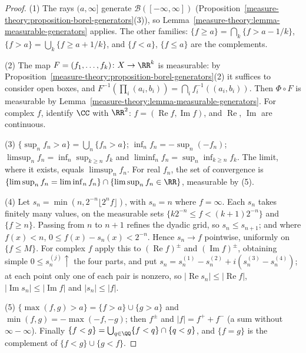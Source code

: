 \begin{proof}
(1) The rays $(a, \infty]$ generate $\mathcal{B}([-\infty, \infty])$ (Proposition~\ref{measure-theory:proposition-borel-generators}(3)), so Lemma~\ref{measure-theory:lemma-measurable-generators} applies. The other
families: $\{f \geq a\} = \bigcap_k\{f > a - 1/k\}$, $\{f > a\} = \bigcup_k\{f \geq a + 1/k\}$, and $\{f < a\}$, $\{f \leq a\}$ are the complements.

(2) The map $F = (f_1, \ldots, f_k) \colon X \to \RR^k$ is measurable: by Proposition~\ref{measure-theory:proposition-borel-generators}(2) it suffices to consider open boxes, and
$F^{-1}(\prod_i(a_i, b_i)) = \bigcap_if_i^{-1}((a_i, b_i))$. Then $\Phi \circ F$ is measurable by Lemma~\ref{measure-theory:lemma-measurable-generators}. For complex $f$, identify $\CC$ with $\RR^2$:
$f = (\operatorname{Re}f, \operatorname{Im}f)$, and $\operatorname{Re}$, $\operatorname{Im}$ are continuous.

(3) $\{\sup_nf_n > a\} = \bigcup_n\{f_n > a\}$; $\inf_nf_n = -\sup_n(-f_n)$; $\limsup_nf_n = \inf_n\sup_{k \geq n}f_k$ and $\liminf_nf_n = \sup_n\inf_{k \geq n}f_k$. The limit, where it exists, equals
$\limsup_nf_n$. For real $f_n$, the set of convergence is $\{\limsup_nf_n = \liminf_nf_n\} \cap \{\limsup_nf_n \in \RR\}$, measurable by (5).

(4) Let $s_n = \min(n, 2^{-n}\lfloor 2^nf\rfloor)$, with $s_n = n$ where $f = \infty$. Each $s_n$ takes finitely many values, on the measurable sets $\{k2^{-n} \leq f < (k + 1)2^{-n}\}$ and
$\{f \geq n\}$. Passing from $n$ to $n + 1$ refines the dyadic grid, so $s_n \leq s_{n+1}$; and where $f(x) < n$, $0 \leq f(x) - s_n(x) < 2^{-n}$. Hence $s_n \to f$ pointwise, uniformly on
$\{f \leq M\}$. For complex $f$ apply this to $(\operatorname{Re}f)^\pm$ and $(\operatorname{Im}f)^\pm$, obtaining simple $0 \leq s_n^{(j)} \uparrow$ the four parts, and put
$s_n = s_n^{(1)} - s_n^{(2)} + i(s_n^{(3)} - s_n^{(4)})$; at each point only one of each pair is nonzero, so $|\operatorname{Re}s_n| \leq |\operatorname{Re}f|$, $|\operatorname{Im}s_n| \leq |\operatorname{Im}f|$
and $|s_n| \leq |f|$.

(5) $\{\max(f, g) > a\} = \{f > a\} \cup \{g > a\}$ and $\min(f, g) = -\max(-f, -g)$; then $f^\pm$ and $|f| = f^+ + f^-$ (a sum without $\infty - \infty$). Finally
$\{f < g\} = \bigcup_{q \in \QQ}\{f < q\} \cap \{q < g\}$, and $\{f = g\}$ is the complement of $\{f < g\} \cup \{g < f\}$.
\end{proof}

